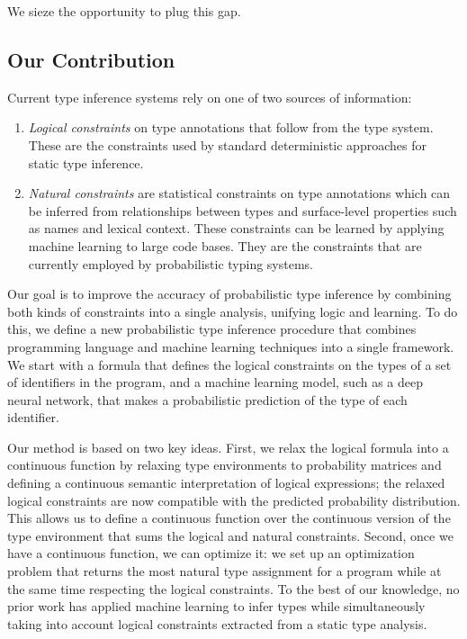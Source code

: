 \documentclass[sigplan,10pt,anonymous]{acmart} %
\theoremstyle{plain}
\theoremstyle{remark}
\theoremstyle{definition}
\begin{document}
We sieze the opportunity to plug this gap.

\subsection{Our Contribution}
Current type inference systems rely
on one of two sources of information:
\begin{enumerate}[label=(\Roman*)]
  \item \emph{Logical constraints} on type annotations that follow from the type system.
        These are the  constraints used by standard deterministic approaches for static type inference.
  \item \emph{Natural constraints} are statistical constraints on type annotations
        which can be inferred from relationships between types and surface-level properties such as names and lexical context.
        These constraints can be learned by applying machine learning to large code bases.
        They are the constraints that are currently employed by probabilistic typing systems.
\end{enumerate}
Our goal is to improve the accuracy of probabilistic type
inference by combining both kinds of constraints into a single analysis, unifying logic and learning.
To do this, we define a new probabilistic type inference procedure that combines
programming language and machine learning techniques into a single framework.
We start with a formula that defines the logical constraints on the types of a set of identifiers in the program,
and a machine learning model, such as a deep neural network, that makes a probabilistic prediction
of the type of each identifier.

Our method is based on two key ideas.
First, we relax the logical formula into a continuous function by relaxing type environments
to probability matrices and defining
a continuous semantic interpretation of logical expressions; the relaxed logical constraints
are now compatible with the predicted probability distribution.
This allows us to define a continuous function over the continuous version of the type environment
that sums the logical and natural constraints.
Second, once we have a continuous function, we can optimize it:
we set up an optimization problem that returns the most natural type assignment for a
program while at the same time respecting the logical constraints.
To the best of our knowledge, no prior work has applied machine learning to infer types
while simultaneously taking into account logical constraints extracted from a static type analysis.
\end{document}
